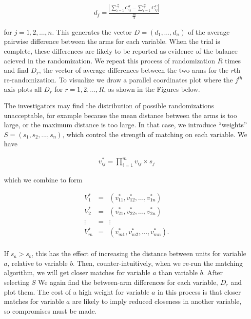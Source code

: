 \documentclass[]{article}
\begin{document}
\begin{eqnarray*}
 d_j = \frac{| \sum_{i = 1}^{\frac{m}{2}}C_{ij}^T - \sum_{i = 1}^{\frac{m}{2}}C_{ij}^C |}{\frac{m}{2}} 
\end{eqnarray*}

for \(j = 1, 2, ..., n.\) This generates the vector
\(D = (d_1, \ldots, d_n)\) of the average pairwise difference between
the arms for each variable. When the trial is complete, these
differences are likely to be reported as evidence of the balance acieved
in the randomization. We repeat this process of randomization \(R\)
times and find \(D_r\), the vector of average differences between the
two arms for the \(r\)th re-randomization. To visualize we draw a
parallel coordinates plot where the \(j^{th}\) axis plots all \(D_r\)
for \(r = 1, 2, ..., R\), as shown in the Figures below.

The investigators may find the distribution of possible randomizations
unacceptable, for example because the mean distance between the arms is
too large, or the maximum distance is too large. In that case, we
introduce ``weights'' \(S = (s_{1}, s_{2},..., s_{n})\), which control
the strength of matching on each variable. We have

\begin{eqnarray*}
 v_{ij}^* = \prod_{i=1}^{m} v_{ij} \times s_j
\end{eqnarray*}

which we combine to form

\begin{eqnarray*}
 V_1^* & = & (v_{11}^*, v_{12}^*,..., v_{1n}^*) \\
 V_2^* & = & (v_{21}^*, v_{22}^*,..., v_{2n}^*) \\
 \vdots & = & \vdots\\    
 V_m^* & = & (v_{m1}^*, v_{m2}^*,..., v_{mn}^*) .\\
\end{eqnarray*}

If \(s_a > s_b\), this has the effect of increasing the distance between
units for variable \(a\), relative to variable \(b\). Then,
counter-intuitively, when we re-run the matching algorithm, we will get
closer matches for variable \(a\) than variable \(b\). After selecting
\(S\) We again find the between-arm differences for each variable,
\(D_r\) and plot them. The cost of a high weight for variable \(a\) in
this process is that closer matches for variable \(a\) are likely to
imply reduced closeness in another variable, so compromises must be
made.
\end{document}
